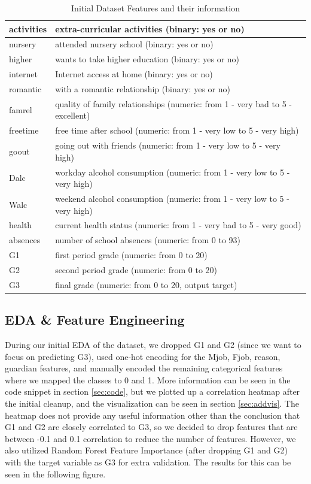 \documentclass[11pt,a4paper]{article}
\begin{document}
\begin{table}[H]
\begin{tabular}{|p{2cm}|p{13cm}|}
activities & extra-curricular activities (binary: yes or no) \\ \hline
nursery & attended nursery school (binary: yes or no) \\ \hline
higher & wants to take higher education (binary: yes or no) \\ \hline
internet & Internet access at home (binary: yes or no) \\ \hline
romantic &  with a romantic relationship (binary: yes or no) \\ \hline
famrel & quality of family relationships (numeric: from 1 - very bad to 5 - excellent) \\ \hline
freetime & free time after school (numeric: from 1 - very low to 5 - very high) \\ \hline
goout & going out with friends (numeric: from 1 - very low to 5 - very high) \\ \hline
Dalc & workday alcohol consumption (numeric: from 1 - very low to 5 - very high) \\ \hline
Walc & weekend alcohol consumption (numeric: from 1 - very low to 5 - very high) \\ \hline
health & current health status (numeric: from 1 - very bad to 5 - very good) \\ \hline
absences & number of school absences (numeric: from 0 to 93) \\ \hline
G1 & first period grade (numeric: from 0 to 20) \\ \hline
G2 & second period grade (numeric: from 0 to 20) \\ \hline
G3 & final grade (numeric: from 0 to 20, output target) \\ \hline
\end{tabular}
\caption{Initial Dataset Features and their information}
\label{tab:initfeatures}
\end{table}


\subsection{EDA \& Feature Engineering}
During our initial EDA of the dataset, we dropped G1 and G2 (since we want to focus on predicting G3), used one-hot encoding for the Mjob, Fjob, reason, guardian features, and manually encoded the remaining categorical features where we mapped the classes to 0 and 1. More information can be seen in the code snippet in section \ref{sec:code}, but we plotted up a correlation heatmap after the initial cleanup, and the visualization can be seen in section \ref{sec:addvis}. The heatmap does not provide any useful information other than the conclusion that G1 and G2 are closely correlated to G3, so we decided to drop features that are between -0.1 and 0.1 correlation to reduce the number of features. However, we also utilized Random Forest Feature Importance (after dropping G1 and G2) with the target variable as G3 for extra validation. The results for this can be seen in the following figure.
\end{document}
